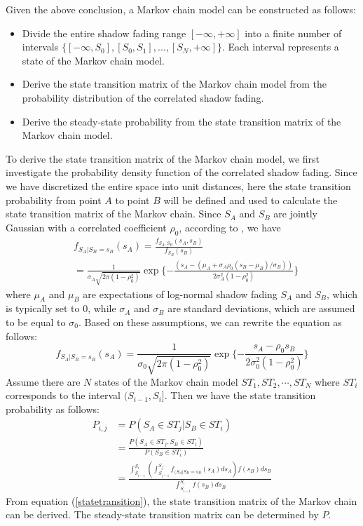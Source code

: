 \par Given the above conclusion, a Markov chain model can be constructed as follows:
\begin{itemize}
\item Divide the entire shadow fading range $[-\infty,+\infty]$ into a finite number of intervals $\{[-\infty,S_{0}],[S_{0},S_{1}],\dots,[S_{N},+\infty]\}$. Each interval represents a state of the Markov chain model.
\item Derive the state transition matrix of the Markov chain model from the probability distribution of the correlated shadow fading.
\item Derive the steady-state probability from the state transition matrix of the Markov chain model.
\end{itemize}
\par To derive the state transition matrix of the Markov chain model, we first investigate the probability density function of the correlated shadow fading. Since we have discretized the entire space into unit distances, here the state transition probability from point $A$ to point $B$ will be defined and used to calculate the state transition matrix of the Markov chain. Since $S_{A}$ and $S_{B}$ are jointly Gaussian with a correlated coefficient $\rho_{0}$, according to \cite{papoulis2002probability}, we have
\begin{equation}
\begin{split}
& f_{S_{A}|S_{B} =s_{B}}(s_{A}) =\frac{f_{S_{A},S_{B}}(s_{A},s_{B})}{f_{S_{B}}(s_{B})}\\
&=\frac{1}{\sigma_{A}\sqrt{2\pi(1-\rho_{0}^{2})}}\exp\{-\frac{(s_{A}-(\mu_{A}+\sigma_{A}\rho_{0}(s_{B}-\mu_{B})/\sigma_{B}))}{2\sigma_{A}^{2}(1-\rho_{0}^{2})}\}
\end{split}
\end{equation}
where $\mu_{A}$ and $\mu_{B}$ are expectations of log-normal shadow fading $S_{A}$ and $S_{B}$, which is typically set to $0$, while $\sigma_{A}$ and $\sigma_{B}$ are standard deviations, which are assumed to be equal to $\sigma_{0}$. Based on these assumptions, we can rewrite the equation as follows:
\begin{equation}
f_{S_{A}|S_{B} =s_{B}}(s_{A}) =\frac{1}{\sigma_{0}\sqrt{2\pi(1-\rho_{0}^{2})}}\exp\{-\frac{s_{A}-\rho_{0}s_{B}}{2\sigma_{0}^{2}(1-\rho_{0}^{2})}\}
\end{equation}
Assume there are $N$ states of the Markov chain model $ST_{1}, ST_{2},\cdots, ST_{N}$ where $ST_{i}$ corresponds to the interval $(S_{i-1}, S_{i}]$. Then we have the state transition probability as follows:
\begin{equation}
\label{statetransition}
\begin{split}
P_{i,j} &= P(S_{A}\in ST_{j}|S_{B}\in ST_{i})\\
&=\frac{P(S_{A}\in ST_{j}, S_{B}\in ST_{i})}{P(S_{B}\in ST_{i})}\\
&=\frac{\int_{S_{i-1}}^{S_{i}}(\int_{S_{j-1}}^{S_{j}}f_{(S_{A}|S_{B}=s_{B}}(s_{A})ds_{A})f(s_{B})ds_{B}}{\int_{S_{i-1}}^{S_{i}}f(s_{B})ds_{B}}
\end{split}
\end{equation}
From equation (\ref{statetransition}), the state transition matrix of the Markov chain can be derived. The steady-state transition matrix can be determined by $P$.
